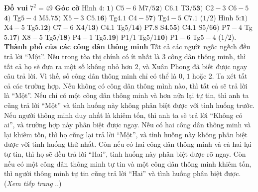 \begin{multicols}{2}
	\textbf{\color{timhieukhoahoc}Đố vui}
	\vskip 0.1cm
	$7^2= 49$
	\vskip 0.1cm
	\textbf{\color{timhieukhoahoc}Góc cờ}
	\vskip 0.1cm
	Hình $4$: $\pmb{1)}$ C$5-6$ M$7/5$\quad $\pmb{2)}$ C$6.1$ T$3/5$\quad $\pmb{3)}$ C$2-3$ C$6-5$ \quad $\pmb{4)}$ Tg$5-4$ M$5.7$\quad $\pmb{5)}$ X$5-3$ C$5.1$\quad $\pmb{6)}$ Tg$4.1$ C$4-5$\quad $\pmb{7)}$ Tg$4-5$ C$7.1$ ($1/2$)
	\vskip 0.1cm
	Hình $5$:$\pmb{1)}$ X$4-5$ Tg$5.1$\quad $\pmb{2)}$ C$7-6$ X$4/1$\quad $\pmb{3)}$ C$4.1$ Tg$5/1$\quad $\pmb{4)}$ P$7.8$ S$4.5$\quad $\pmb{5)}$ C$4.1$ S$5/6$\quad $\pmb{6)}$ P$7-4$ Tg$5.1$\quad $\pmb{7)}$ X$8-5$ Tg$5/1$\quad $\pmb{8)}$ P$4-1$ Tg$5.1$\quad $\pmb{9)}$ P$1/1$ Tg$5/1$\quad $\pmb{10)}$ P$1-6$ Tg$5-4$ ($1/2$).
	\vskip 0.1cm
	\textbf{\color{timhieukhoahoc}Thành phố của các công dân thông minh}
	\vskip 0.1cm
	Tất cả các người ngốc ngếch đều trả lời “Một”. Nếu trong tòa thị chính  có ít nhất là $3$ công dân thông minh, thì tất cả họ sẽ đưa ra một số không nhỏ hơn $2$, và Xuân Phong đã biết được ngay câu trả lời. Vì thế, số công dân thông minh chỉ có thể là $0$, $1$ hoặc $2$. Ta xét tất cả các trường hợp.
	\vskip 0.1cm
	Nếu không có công dân thông mình nào, thì tất cả sẽ trả lời là “Một”. Nếu chỉ có một công dân thông minh và hơn nữa lại tự tin, thì anh ta cũng trả lời “Một” và tình huống này không phân biệt được với tình huống trước. Nếu người thông minh duy nhất là khiêm tốn, thì anh ta sẽ trả lời “Không có ai”, và trường hợp này phân biệt được ngay.
	\vskip 0.1cm
	Nếu có hai công dân thông minh và lại khiêm tốn, thì họ cũng lại trả lời “Một”, và tình huống này không phân biệt được với tình huống thứ nhất. Còn nếu có hai công dân thông minh và cả hai lại tự tin, thì họ sẽ đều trả lời “Hai”, tình huống này phân biệt được rõ ngay. Còn nếu có một công dân thông minh tự tin và một công dân thông minh khiêm tốn, thì người thông minh tự tin cũng trả lời “Hai” và tình huống phân biệt được.
	\vskip 0.1cm
	\hfill (\textit{Xem tiếp trang} ..)
\end{multicols}


